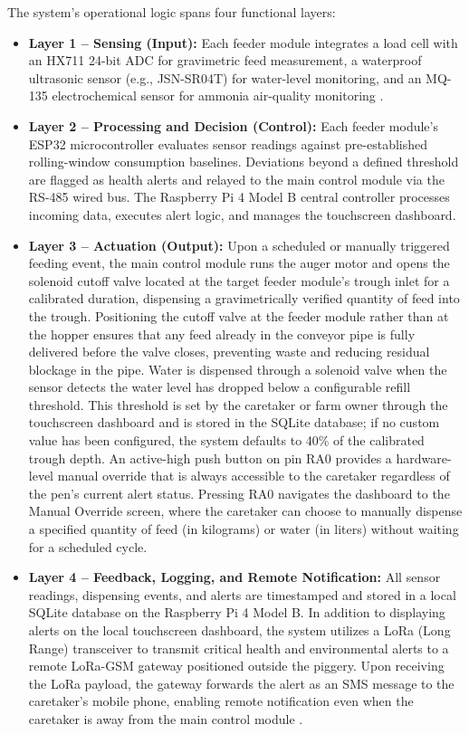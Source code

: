The system's operational logic spans four functional layers:
\begin{itemize}
  \item \textbf{Layer 1 -- Sensing (Input):} Each feeder module integrates a load cell with an HX711 24-bit ADC for gravimetric feed measurement, a waterproof ultrasonic sensor (e.g., JSN-SR04T) for water-level monitoring, and an MQ-135 electrochemical sensor for ammonia air-quality monitoring \cite{sadeghi2023improving,whitney2018water,samuel2025water}.
  \item \textbf{Layer 2 -- Processing and Decision (Control):} Each feeder module's ESP32 microcontroller evaluates sensor readings against pre-established rolling-window consumption baselines. Deviations beyond a defined threshold are flagged as health alerts and relayed to the main control module via the RS-485 wired bus. The Raspberry Pi 4 Model B central controller processes incoming data, executes alert logic, and manages the touchscreen dashboard.
  \item \textbf{Layer 3 -- Actuation (Output):} Upon a scheduled or manually triggered feeding event, the main control module runs the auger motor and opens the solenoid cutoff valve located at the target feeder module's trough inlet for a calibrated duration, dispensing a gravimetrically verified quantity of feed into the trough. Positioning the cutoff valve at the feeder module rather than at the hopper ensures that any feed already in the conveyor pipe is fully delivered before the valve closes, preventing waste and reducing residual blockage in the pipe. Water is dispensed through a solenoid valve when the sensor detects the water level has dropped below a configurable refill threshold. This threshold is set by the caretaker or farm owner through the touchscreen dashboard and is stored in the SQLite database; if no custom value has been configured, the system defaults to 40\% of the calibrated trough depth. An active-high push button on pin RA0 provides a hardware-level manual override that is always accessible to the caretaker regardless of the pen's current alert status. Pressing RA0 navigates the dashboard to the Manual Override screen, where the caretaker can choose to manually dispense a specified quantity of feed (in kilograms) or water (in liters) without waiting for a scheduled cycle.
  \item \textbf{Layer 4 -- Feedback, Logging, and Remote Notification:} All sensor readings, dispensing events, and alerts are timestamped and stored in a local SQLite database on the Raspberry Pi 4 Model B. In addition to displaying alerts on the local touchscreen dashboard, the system utilizes a LoRa (Long Range) transceiver to transmit critical health and environmental alerts to a remote LoRa-GSM gateway positioned outside the piggery. Upon receiving the LoRa payload, the gateway forwards the alert as an SMS message to the caretaker's mobile phone, enabling remote notification even when the caretaker is away from the main control module \cite{beyondtech2025smart,reza2025review}.
\end{itemize}

